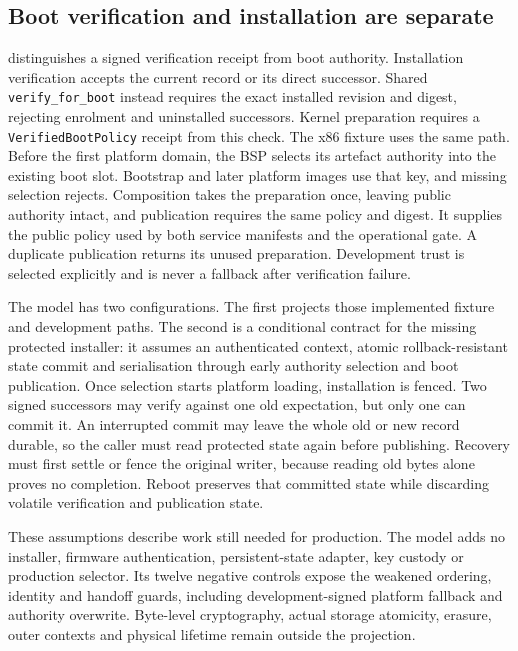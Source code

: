 \subsection{Boot verification and installation are separate}

 distinguishes a signed verification receipt from
boot authority. Installation verification accepts the current record or its
direct successor. Shared \texttt{verify\_for\_boot} instead requires the exact
installed revision and digest, rejecting enrolment and uninstalled successors.
Kernel preparation requires a \texttt{VerifiedBootPolicy} receipt from this
check. The x86 fixture uses the same path. Before the first platform domain,
the BSP selects its artefact authority into the existing boot slot. Bootstrap
and later platform images use that key, and missing selection rejects. Composition
takes the preparation once, leaving public authority intact, and publication
requires the same policy and digest. It supplies the public policy used by
both service manifests and the operational gate.
A duplicate publication returns its unused preparation. Development trust is
selected explicitly and is never a fallback after verification failure.

The model has two configurations. The first projects those implemented fixture
and development paths. The second is a conditional contract for the missing
protected installer: it assumes an authenticated context, atomic rollback-resistant
state commit and serialisation through early authority selection and boot
publication. Once selection starts platform loading, installation is fenced. Two signed successors
may verify against one old expectation, but only one can commit it. An interrupted
commit may leave the whole old or new record durable, so the caller must read
protected state again before publishing. Recovery must first settle or fence the
original writer, because reading old bytes alone proves no completion. Reboot preserves that committed state
while discarding volatile verification and publication state.

These assumptions describe work still needed for production. The model adds
no installer, firmware authentication, persistent-state adapter, key custody or
production selector. Its twelve negative controls expose the weakened ordering,
identity and handoff guards, including development-signed platform fallback
and authority overwrite. Byte-level cryptography, actual storage atomicity,
erasure, outer contexts and physical lifetime remain outside the projection.

